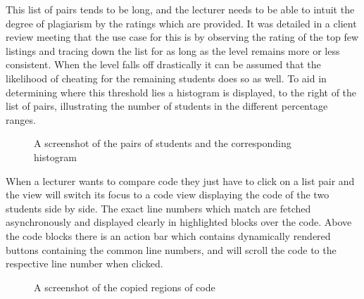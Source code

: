 \documentclass[11pt,a4paper]{article}
\begin{document}
This list of pairs tends to be long, and the lecturer needs to be able to intuit the degree of plagiarism by the ratings which are provided. It was detailed in a client review meeting that the use case for this is by observing the rating of the top few listings and tracing down the list for as long as the level remains more or less consistent. When the level falls off drastically it can be assumed that the likelihood of cheating for the remaining students does so as well. To aid  in determining where this threshold lies a histogram is displayed, to the right of the list of pairs, illustrating the number of students in the different percentage ranges.

\begin{figure}[h!]
  \caption{A screenshot of the pairs of students and the corresponding histogram}
  \label{fig:pairshistogram}
\end{figure}

When a lecturer wants to compare code they just have to click on a list pair and the view will switch its focus to a code view displaying the code of the two students side by side. The exact line numbers which match are fetched asynchronously and displayed clearly in highlighted blocks over the code. Above the code blocks there is an action bar which contains dynamically rendered buttons containing the common line numbers, and will scroll the code to the respective line number when clicked.

\begin{figure}[h!]
  \caption{A screenshot of the copied regions of code}
  \label{fig:codeview}
\end{figure}
\end{document}
